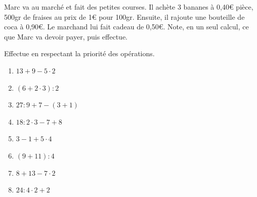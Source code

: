 \documentclass[syllabus_1.tex]{subfiles}
\begin{document}
\begin{exercise}
    Marc va au marché et fait des petites courses. Il achète 3 bananes à
    0,40€ pièce, 500gr de fraises au prix de 1€ pour 100gr. Ensuite, il
    rajoute une bouteille de coca à 0,90€. Le marchand lui fait cadeau de
    0,50€. Note, en un seul calcul, ce que Marc va devoir payer, puis
    effectue.
\end{exercise}

\begin{exercise}
    Effectue en respectant la priorité des opérations.
    \begin{enumerate}[cols=4]
        \item \(13 + 9 - 5 \cdot 2\)
        \item \((6 + 2 \cdot 3) :2\)
        \item \(27 : 9 + 7 - (3 + 1)\)
        \item \(18 : 2 \cdot 3 - 7 + 8\)
        \item $3 - 1 + 5 \cdot 4$
        \item $\left(9+11\right) : 4$
        \item $8 + 13 - 7 \cdot 2$
        \item $24 : 4 \cdot 2 + 2$
    \end{enumerate}
\end{exercise}
\end{document}
